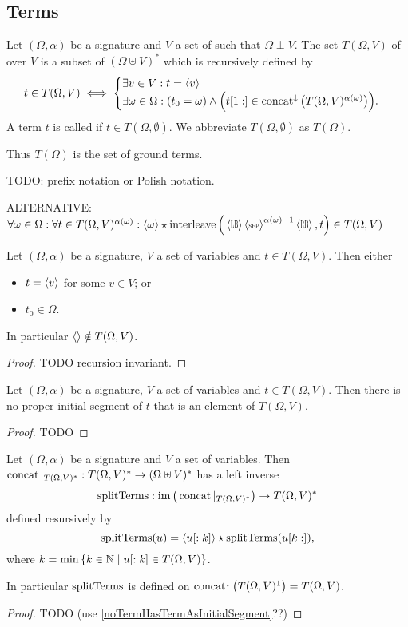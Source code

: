 \subsection{Terms}
\begin{definition}
Let $(\Omega, \alpha)$ be a signature and $V$ a set of  such that $\Omega\perp V$. The set $T(\Omega, V)$ of  over $V$ is a subset of $(\Omega\uplus V)^*$ which is recursively defined by
\[ t\in T(\Omega, V) \iff \begin{cases}
\exists v\in V: t = \left\langle v \right\rangle \\
\exists \omega\in \Omega: (t_0 = \omega) \land \Big(t[1:] \in \operatorname{concat}^{\downarrow}\big(T(\Omega, V)^{\alpha(\omega)}\big) \Big).
\end{cases} \]
A term $t$ is called  if $t\in T(\Omega, \emptyset)$. We abbreviate $T(\Omega, \emptyset)$ as $T(\Omega)$.
\end{definition}
Thus $T(\Omega)$ is the set of ground terms.

TODO: prefix notation or Polish notation.

ALTERNATIVE: $\forall \omega\in\Omega: \forall t\in T(\Omega, V)^{\alpha(\omega)}: \seq{\omega}\concat \strInterleave\Big(\seq{\LB}\seq{\SEP}^{\alpha(\omega)-1}\seq{\RB}, t\Big) \in T(\Omega, V)$

\begin{lemma} \label{initialElementUATerm}
Let $(\Omega, \alpha)$ be a signature, $V$ a set of variables and $t\in T(\Omega, V)$. Then either
\begin{itemize}
\item $t = \left\langle v \right\rangle$ for some $v\in V$; or
\item $t_0\in \Omega$.
\end{itemize}
In particular $\left\langle  \right\rangle\notin T(\Omega, V)$.
\end{lemma}
\begin{proof}
TODO recursion invariant.
\end{proof}

\begin{lemma} \label{noTermHasTermAsInitialSegment}
Let $(\Omega, \alpha)$ be a signature, $V$ a set of variables and $t\in T(\Omega,V)$. Then there is no proper initial segment of $t$ that is an element of $T(\Omega, V)$.
\end{lemma}
\begin{proof}
TODO
\end{proof}

\begin{lemma}
Let $(\Omega, \alpha)$ be a signature and $V$ a set of variables. Then $\operatorname{concat}|_{T(\Omega, V)^*}: T(\Omega, V)^* \to (\Omega \uplus V)^*$ has a left inverse
\[ \operatorname{splitTerms}: \operatorname{im}\big(\operatorname{concat}|_{T(\Omega, V)^*}\big) \to T(\Omega, V)^* \]
defined resursively by
\[ \operatorname{splitTerms}(u) = \left\langle u[:k] \right\rangle \star \operatorname{splitTerms}(u[k:]), \]
where $k = \min\left\{ k\in\mathbb{N} \;\middle|\; u[:k]\in T(\Omega,V) \right\}$.
\end{lemma}
In particular $\operatorname{splitTerms}$ is defined on $\operatorname{concat}^\downarrow\big(T(\Omega, V)^1\big) = T(\Omega, V)$.
\begin{proof}
TODO (use \ref{noTermHasTermAsInitialSegment}??)
\end{proof}

